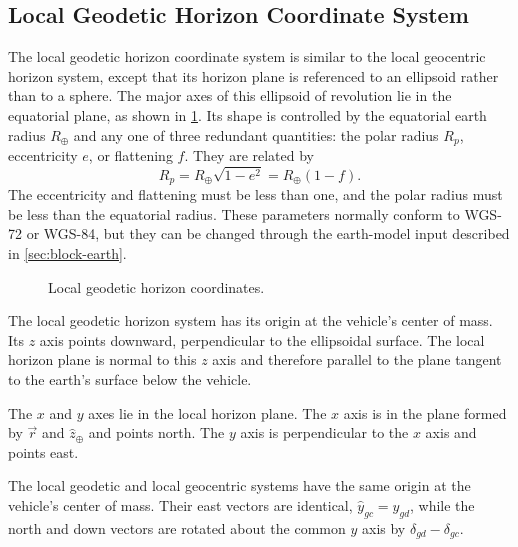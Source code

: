 \subsection{Local Geodetic Horizon Coordinate System}\label{sec:local-geodetic}

The local geodetic horizon coordinate system is similar to the local geocentric
horizon system, except that its horizon plane is referenced to an ellipsoid rather
than to a sphere. The major axes of this ellipsoid of revolution lie in the equatorial
plane, as shown in \cref{fig:local-geodetic-horizon}. Its shape is controlled by the
equatorial earth radius $R_{\oplus}$ and any one of three redundant quantities: the
polar radius $R_p$, eccentricity $e$, or flattening $f$. They are related by
\begin{equation}
  R_p = R_{\oplus}\sqrt{1-e^2}=R_{\oplus}(1-f).
  \label{eq:ellipsoid-parameter-relation}
\end{equation}
The eccentricity and flattening must be less than one, and the polar radius must be
less than the equatorial radius. These parameters normally conform to WGS-72
or WGS-84, but they can be changed through the earth-model input described
in \cref{sec:block-earth}.

\begin{figure}[htbp]
  \centering
  \resizebox{0.72\linewidth}{!}{}
  \caption{Local geodetic horizon coordinates.}
  \label{fig:local-geodetic-horizon}
\end{figure}

The local geodetic horizon system has its origin at the vehicle's center of mass. Its
$z$ axis points downward, perpendicular to the ellipsoidal surface. The local horizon
plane is normal to this $z$ axis and therefore parallel to the plane tangent to the
earth's surface below the vehicle.

The $x$ and $y$ axes lie in the local horizon plane. The $x$ axis is in the plane
formed by $\vec{r}$ and $\hat{z}_{\oplus}$ and points north. The $y$ axis is
perpendicular to the $x$ axis and points east.

The local geodetic and local geocentric systems have the same origin at the vehicle's
center of mass. Their east vectors are identical, $\hat{y}_{gc}=\hat{y}_{gd}$, while
the north and down vectors are rotated about the common $y$ axis by
$\delta_{gd}-\delta_{gc}$.

